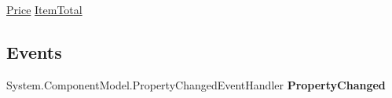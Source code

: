 \begin{DoxyCompactItemize}
\begin{DoxyCompactList}\small\item\em \end{DoxyCompactList}\item 
\hypertarget{class_price___comparison_1_1amazon_1_1ecs_1_1_cart_item_afa2414b90571c8af3b86495bd7b9b295}{\hyperlink{class_price___comparison_1_1amazon_1_1ecs_1_1_price}{Price} \hyperlink{class_price___comparison_1_1amazon_1_1ecs_1_1_cart_item_afa2414b90571c8af3b86495bd7b9b295}{Item\-Total}}\label{class_price___comparison_1_1amazon_1_1ecs_1_1_cart_item_afa2414b90571c8af3b86495bd7b9b295}

\begin{DoxyCompactList}\small\item\em \end{DoxyCompactList}\end{DoxyCompactItemize}
\subsection*{Events}
\begin{DoxyCompactItemize}
\item 
\hypertarget{class_price___comparison_1_1amazon_1_1ecs_1_1_cart_item_ad3bcb7c8f5607c671df11610ce989a59}{System.\-Component\-Model.\-Property\-Changed\-Event\-Handler {\bfseries Property\-Changed}}\label{class_price___comparison_1_1amazon_1_1ecs_1_1_cart_item_ad3bcb7c8f5607c671df11610ce989a59}

\end{DoxyCompactItemize}
